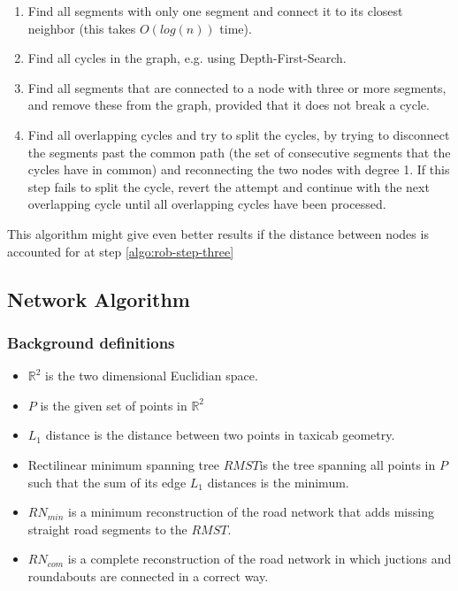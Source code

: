 \documentclass[11pt]{article}
\begin{document}
\begin{enumerate}
\item Find all segments with only one segment and connect it to its closest neighbor (this takes $O(log(n))$ time).

\item Find all cycles in the graph, e.g. using Depth-First-Search.

\item\label{algo:rob-step-three} Find all segments that are connected to a node with three or more segments, and remove these from the graph, provided that it does not break a cycle.

\item Find all overlapping cycles and try to split the cycles, by trying to disconnect the segments past the common path (the set of consecutive segments that the cycles have in common) and reconnecting the two nodes with degree 1. If this step fails to split the cycle, revert the attempt and continue with the next overlapping cycle until all overlapping cycles have been processed.

\end{enumerate}

This algorithm might give even better results if the distance between nodes is accounted for at step \ref{algo:rob-step-three}

\subsection{Network Algorithm}
\subsubsection{Background definitions}
\begin{itemize}
  \item $\mathbb{R}^2$ is the two dimensional Euclidian space.
  \item $P$ is the given set of points in $\mathbb{R}^2$
  \item $L_1$ distance is the distance between two points in taxicab geometry.
  \item Rectilinear minimum spanning tree $RMST$is the tree spanning all points in $P$ such that the sum of its edge $L_1$ distances is the minimum.
  \item $RN_{min}$ is a minimum reconstruction of the road network that adds missing straight road segments to the $RMST$.
  \item $RN_{com}$ is a complete reconstruction of the road network in which juctions and roundabouts are connected in a correct way.
\end{itemize}
\end{document}
